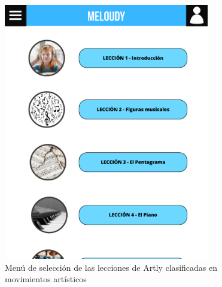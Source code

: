 \begin{figure}[H]

    \centering
    \includegraphics[width=0.8\textwidth]{imagenes/c3/boceto.png}
    \caption{Menú de selección de las lecciones de Artly clasificadas en movimientos artísticos}
    \label{fig:artly}

\end{figure}